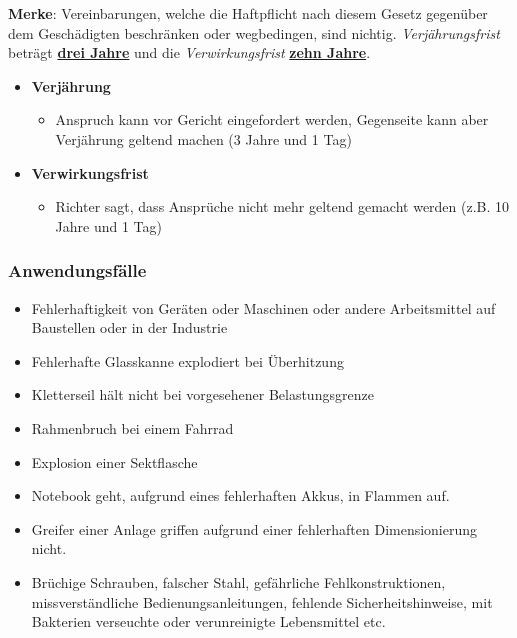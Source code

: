\vspace{5mm}

\textbf{Merke}: Vereinbarungen, welche die Haftpflicht nach diesem Gesetz gegenüber dem Geschädigten beschränken oder wegbedingen, sind nichtig.
\textit{\textcolor{OSTPink}{Verjährungsfrist}} beträgt \textbf{\underline{drei Jahre}} und die \textit{\textcolor{OSTPink}{Verwirkungsfrist}} \textbf{\underline{zehn Jahre}}.

\begin{itemize}
    \item \textbf{\textcolor{OSTPink}{Verjährung}}
    \begin{itemize}
        \item Anspruch kann vor Gericht eingefordert werden, Gegenseite kann aber Verjährung geltend machen (3 Jahre und 1 Tag)
    \end{itemize}
    \item \textbf{\textcolor{OSTPink}{Verwirkungsfrist}}
    \begin{itemize}
        \item Richter sagt, dass Ansprüche nicht mehr geltend gemacht werden (z.B. 10 Jahre und 1 Tag)
    \end{itemize}
\end{itemize}

\subsubsection{Anwendungsfälle}
\begin{itemize}
    \item Fehlerhaftigkeit von Geräten oder Maschinen oder andere Arbeitsmittel auf Baustellen oder in der Industrie
    \item Fehlerhafte Glasskanne explodiert bei Überhitzung
    \item Kletterseil hält nicht bei vorgesehener Belastungsgrenze
    \item Rahmenbruch bei einem Fahrrad
    \item Explosion einer Sektflasche
    \item Notebook geht, aufgrund eines fehlerhaften Akkus, in Flammen auf.
    \item Greifer einer Anlage griffen aufgrund einer fehlerhaften Dimensionierung nicht.
    \item Brüchige Schrauben, falscher Stahl, gefährliche Fehlkonstruktionen, missverständliche Bedienungsanleitungen, fehlende Sicherheitshinweise, mit Bakterien verseuchte oder verunreinigte Lebensmittel etc.
\end{itemize}

